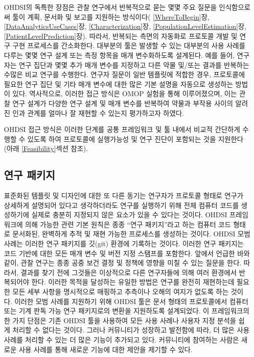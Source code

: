 \documentclass[11pt]{book}
\theoremstyle{definition}
\theoremstyle{definition}
\theoremstyle{definition}
\theoremstyle{remark}
\begin{document}
OHDSI의 독특한 장점은 관찰 연구에서 반복적으로 묻는 몇몇 주요 질문을
인식함으로써 툴이 계획, 문서화 및 보고를 지원하는 방식이다(
\ref{WhereToBegin}장, \ref{DataAnalyticsUseCases}장,
\ref{Characterization}장, \ref{PopulationLevelEstimation}장,
\ref{PatientLevelPrediction}장). 따라서, 반복되는 측면의 자동화로
프로토콜 개발 및 연구 구현 프로세스를 간소화한다. 대부분의 툴은 발생할
수 있는 대부분의 사용 사례를 다루는 몇몇 연구 설계 또는 측정 항목을 매개
변수화하도록 설계된다. 예를 들어, 연구자는 연구 집단과 몇몇 추가 매개
변수를 지정하고 다른 약물 및/또는 결과를 반복하는 수많은 비교 연구를
수행한다. 연구자 질문이 일반 템플릿에 적합한 경우, 프로토콜에 필요한
연구 집단 및 기타 매개 변수에 대한 많은 기본 설명을 자동으로 생성하는
방법이 있다. 역사적으로, 이러한 접근 방식은 OMOP 실험을 통해
이루어졌으며, 이는 관찰 연구 설계가 다양한 연구 설계 및 매개 변수를
반복하여 약물과 부작용 사이의 알려진 인과 관계를 얼마나 잘 재현할 수
있는지 평가하고자 하였다.

OHDSI 접근 방식은 이러한 단계를 공통 프레임워크 및 툴 내에서 비교적
간단하게 수행할 수 있도록 하여 프로토콜에 실행가능성 및 연구 진단이
포함되는 것을 지원한다(아래 \ref{Feasibility}섹션 참조).

\subsection{연구 패키지}\label{-}


표준화된 템플릿 및 디자인에 대한 또 다른 동기는 연구자가 프로토콜 형태로
연구가 상세하게 설명되어 있다고 생각하더라도 연구를 실행하기 위해 전체
컴퓨터 코드를 생성하기에 실제로 충분히 지정되지 않은 요소가 있을 수
있다는 것이다. OHDSI 프레임워크에 의해 가능한 관련 기본 원칙은 종종
``연구 패키지''라고 하는 컴퓨터 코드 형태로 문서화된, 완벽하게 추적 및
재현 가능한 프로세스를 생성하는 것이다. OHDSI 모범 사례는 이러한 연구
패키지를 깃(git) 환경에 기록하는 것이다. 이러한 연구 패키지는 코드
기반에 대한 모든 매개 변수 및 버전 지정 스탬프를 포함한다. 앞에서 언급한
바와 같이, 관찰 연구는 종종 공중 보건 결정 및 정책에 영향을 미칠 수 있는
질문을 한다. 따라서, 결과를 찾기 전에 그것들은 이상적으로 다른
연구자들에 의해 여러 환경에서 반복되어야 한다. 이러한 목적을 달성하는
유일한 방법은 연구를 완전히 재현하는데 필요한 모든 세부 사항을
명시적으로 매핑하고 추측이나 오해의 여지가 없도록 하는 것이다. 이러한
모범 사례를 지원하기 위해 OHDSI 툴은 문서 형태의 프로토콜에서 컴퓨터
또는 기계 판독 가능 연구 패키지로의 변환을 지원하도록 설계되었다. 이
프레임워크의 한 가지 단점은 기존 OHDSI 툴을 사용하여 모든 사용 사례나
사용자 지정 분석을 쉽게 처리할 수 없다는 것이다. 그러나 커뮤니티가
성장하고 발전함에 따라, 더 많은 사용 사례를 처리할 수 있는 더 많은
기능이 추가되고 있다. 커뮤니티에 참여하는 사람은 새로운 사용 사례를 통해
새로운 기능에 대한 제안을 제기할 수 있다.
\end{document}
